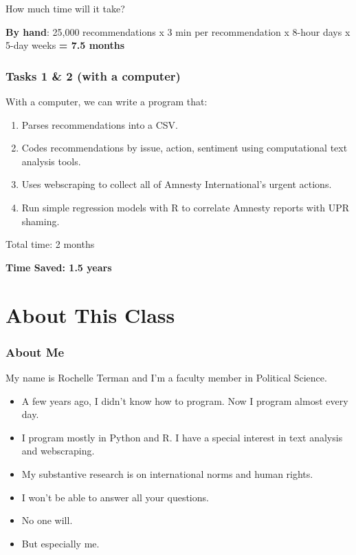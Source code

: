 \documentclass[]{book}
\providecommand{\tightlist}{%
  \setlength{\itemsep}{0pt}\setlength{\parskip}{0pt}}
\begin{document}
How much time will it take?

\textbf{By hand}: 25,000 recommendations x 3 min per recommendation x 8-hour days x 5-day weeks \textbf{= 7.5 months}

\hypertarget{tasks-1-2-with-a-computer}{%
\subsubsection*{Tasks 1 \& 2 (with a computer)}\label{tasks-1-2-with-a-computer}}

With a computer, we can write a program that:

\begin{enumerate}
\def\labelenumi{\arabic{enumi}.}
\tightlist
\item
  Parses recommendations into a CSV.
\item
  Codes recommendations by issue, action, sentiment using computational text analysis tools.
\item
  Uses webscraping to collect all of Amnesty International's urgent actions.
\item
  Run simple regression models with R to correlate Amnesty reports with UPR shaming.
\end{enumerate}

Total time: 2 months

\textbf{Time Saved: 1.5 years}

\hypertarget{about-this-class}{%
\section{About This Class}\label{about-this-class}}

\hypertarget{about-me}{%
\subsubsection*{About Me}\label{about-me}}

My name is Rochelle Terman and I'm a faculty member in Political Science.

\begin{itemize}
\tightlist
\item
  A few years ago, I didn't know how to program. Now I program almost every day.
\item
  I program mostly in Python and R. I have a special interest in text analysis and webscraping.
\item
  My substantive research is on international norms and human rights.
\item
  I won't be able to answer all your questions.
\item
  No one will.
\item
  But especially me.
\end{itemize}
\end{document}
